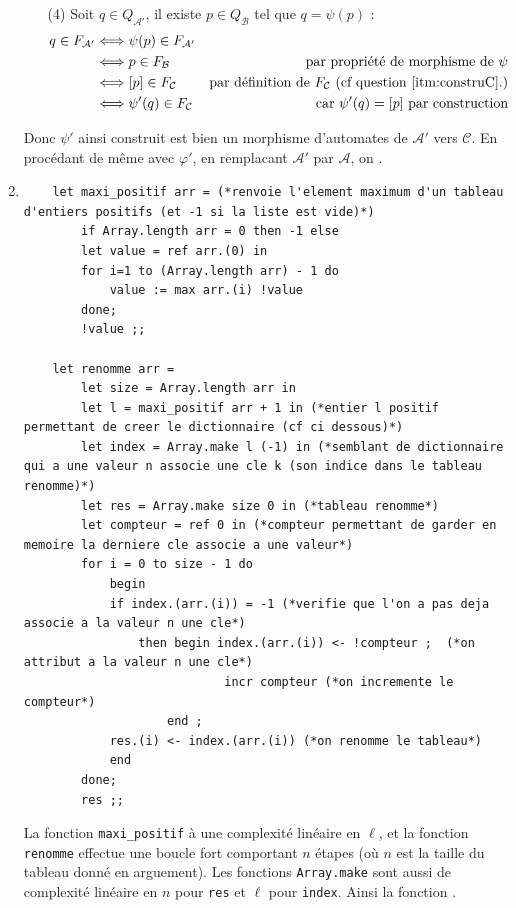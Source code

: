 \documentclass{article}
\begin{document}
\begin{enumerate}
\begin{itemize}
        \item[(4)] Soit $q \in Q_\mathcal{A'}$, il existe $p \in Q_\mathcal{B}$ tel que $q = \psi(p)$ : 
            \begin{align*}
                q \in F_\mathcal{A'} & \Longleftrightarrow \psi(p) \in F_\mathcal{A'} & \\
                & \Longleftrightarrow p \in F_\mathcal{B} & \text{par propriété de morphisme de $\psi$} \\
                & \Longleftrightarrow [p] \in F_\mathcal{C} & \text{par définition de $F_\mathcal{C}$ (cf question \ref{itm:construC}.)} \\
                & \Longleftrightarrow \psi'(q) \in F_\mathcal{C} & \text{car $\psi'(q) = [p]$ par construction} 
            \end{align*}
    \end{itemize}
    Donc $\psi'$ ainsi construit est bien un morphisme d'automates de $\mathcal{A'}$ vers $\mathcal{C}$. En procédant de même avec $\varphi'$, en remplacant $\mathcal{A'}$ par $\mathcal{A}$, on .
    \item 
    \begin{verbatim}
    let maxi_positif arr = (*renvoie l'element maximum d'un tableau d'entiers positifs (et -1 si la liste est vide)*)
        if Array.length arr = 0 then -1 else
        let value = ref arr.(0) in 
        for i=1 to (Array.length arr) - 1 do
            value := max arr.(i) !value
        done; 
        !value ;; 
        
    let renomme arr =
        let size = Array.length arr in 
        let l = maxi_positif arr + 1 in (*entier l positif permettant de creer le dictionnaire (cf ci dessous)*)
        let index = Array.make l (-1) in (*semblant de dictionnaire qui a une valeur n associe une cle k (son indice dans le tableau renomme)*)
        let res = Array.make size 0 in (*tableau renomme*)
        let compteur = ref 0 in (*compteur permettant de garder en memoire la derniere cle associe a une valeur*)
        for i = 0 to size - 1 do
            begin
            if index.(arr.(i)) = -1 (*verifie que l'on a pas deja associe a la valeur n une cle*)
                then begin index.(arr.(i)) <- !compteur ;  (*on attribut a la valeur n une cle*)
                            incr compteur (*on incremente le compteur*)
                    end ;
            res.(i) <- index.(arr.(i)) (*on renomme le tableau*)
            end
        done;
        res ;;
    \end{verbatim}
    La fonction \verb|maxi_positif| à une complexité linéaire en $\ell$, et la fonction \verb|renomme| effectue une boucle fort comportant $n$ étapes (où $n$ est la taille du tableau donné en arguement). Les fonctions \verb|Array.make| sont aussi de complexité linéaire en $n$ pour \verb|res| et $\ell$ pour \verb|index|. \newline 
    Ainsi la fonction \cprotect{}.


\end{enumerate}
\end{document}
